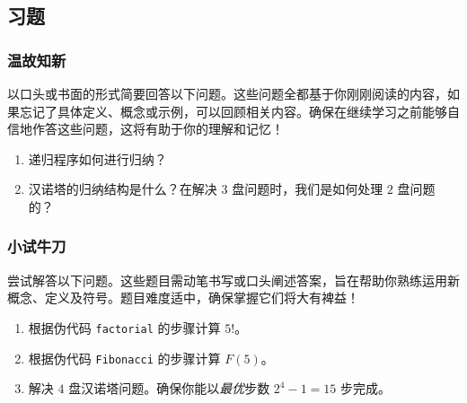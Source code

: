 \subsection{习题}

\subsubsection*{温故知新}

以口头或书面的形式简要回答以下问题。这些问题全都基于你刚刚阅读的内容，如果忘记了具体定义、概念或示例，可以回顾相关内容。确保在继续学习之前能够自信地作答这些问题，这将有助于你的理解和记忆！

\begin{enumerate}[label=(\arabic*)]
    \item 递归程序如何进行归纳？
    \item 汉诺塔的归纳结构是什么？在解决 $3$ 盘问题时，我们是如何处理 $2$ 盘问题的？
\end{enumerate}

\subsubsection*{小试牛刀}

尝试解答以下问题。这些题目需动笔书写或口头阐述答案，旨在帮助你熟练运用新概念、定义及符号。题目难度适中，确保掌握它们将大有裨益！

\begin{enumerate}[label=(\arabic*)]
    \item 根据伪代码 \verb|factorial| 的步骤计算 $5!$。
    \item 根据伪代码 \verb|Fibonacci| 的步骤计算 $F(5)$。
    \item 解决 $4$ 盘汉诺塔问题。确保你能以\emph{最优}步数 $2^4 - 1 = 15$ 步完成。
\end{enumerate}